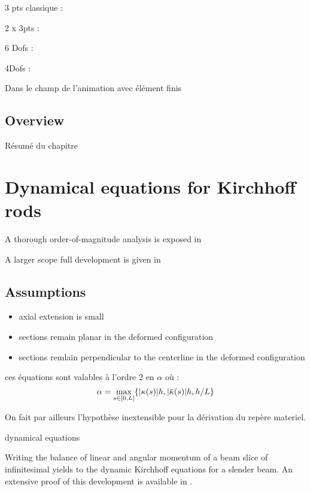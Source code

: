 3 pts classique :
\cite{Adriaenssens1999}
\cite{Douthe2006}

2 x 3pts :
\cite{Barnes2013}

6 Dofs :
\cite{DAmico2014}

4Dofs :
\cite{DuPeloux2015}
\cite{DAmico2016}

Dans le champ de l'animation  avec élément finis
\cite{Duan2013}
\cite{Meier2014}


\subsection{Overview}
Résumé du chapitre


\section{Dynamical equations for Kirchhoff rods}

A thorough order-of-magnitude analysis is exposed in \cite{Dill1992, Bernard1993}

A larger scope full development is given in \cite{Antman2005}

\subsection{Assumptions}

\begin{itemize}
	\item axial extension is small
	\item sections remain planar in the deformed configuration
	\item sections remlain perpendicular to the centerline in the deformed configuration
\end{itemize}

ces équations sont valables à l'ordre 2 en $\alpha$ où :
\begin{equation}
	\alpha = \max_{s \in [0,L]} \{ \abs{\kappa(s)} h, \abs{\overbar{\kappa}(s)} h, h/L\}
\end{equation}

On fait par ailleurs l'hypothèse inextensible pour la dérivation du repère materiel.

dynamical equations

Writing the balance of linear and angular momentum of a beam slice of infinitesimal yields to the dynamic Kirchhoff equations for a slender beam. An extensive proof of this development is available in \cite{Dill1992}.


